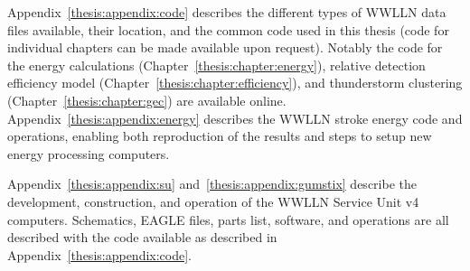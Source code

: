 Appendix~\ref{thesis:appendix:code} describes the different types of WWLLN data files available, their location, and the common code used in this thesis (code for individual chapters can be made available upon request).
Notably the code for the energy calculations (Chapter~\ref{thesis:chapter:energy}), relative detection efficiency model (Chapter~\ref{thesis:chapter:efficiency}), and thunderstorm clustering (Chapter~\ref{thesis:chapter:gec}) are available online.
Appendix~\ref{thesis:appendix:energy} describes the WWLLN stroke energy code and operations, enabling both reproduction of the results and steps to setup new energy processing computers.

Appendix~\ref{thesis:appendix:su} and~\ref{thesis:appendix:gumstix} describe the development, construction, and operation of the WWLLN Service Unit v4 computers.
Schematics, EAGLE files, parts list, software, and operations are all described with the code available as described in Appendix~\ref{thesis:appendix:code}.
